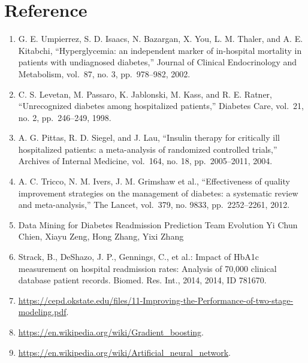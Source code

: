 \documentclass[]{article}
\begin{document}
\section{Reference}\label{reference}

\begin{enumerate}
\def\labelenumi{\arabic{enumi}.}
\itemsep1pt\parskip0pt
\item
  G. E. Umpierrez, S. D. Isaacs, N. Bazargan, X. You, L. M. Thaler, and
  A. E. Kitabchi, ``Hyperglycemia: an independent marker of in-hospital
  mortality in patients with undiagnosed diabetes,'' Journal of Clinical
  Endocrinology and Metabolism, vol.~87, no. 3, pp.~978--982, 2002.
\item
  C. S. Levetan, M. Passaro, K. Jablonski, M. Kass, and R. E. Ratner,
  ``Unrecognized diabetes among hospitalized patients,'' Diabetes Care,
  vol.~21, no. 2, pp.~246--249, 1998.
\item
  A. G. Pittas, R. D. Siegel, and J. Lau, ``Insulin therapy for
  critically ill hospitalized patients: a meta-analysis of randomized
  controlled trials,'' Archives of Internal Medicine, vol.~164, no. 18,
  pp.~2005--2011, 2004.
\item
  A. C. Tricco, N. M. Ivers, J. M. Grimshaw et al., ``Effectiveness of
  quality improvement strategies on the management of diabetes: a
  systematic review and meta-analysis,'' The Lancet, vol.~379, no. 9833,
  pp.~2252--2261, 2012.
\item
  Data Mining for Diabetes Readmission Prediction Team Evolution Yi Chun
  Chien, Xiayu Zeng, Hong Zhang, Yixi Zhang
\item
  Strack, B., DeShazo, J. P., Gennings, C., et al.: Impact of HbA1c
  measurement on hospital readmission rates: Analysis of 70,000 clinical
  database patient records. Biomed. Res. Int., 2014, 2014, ID 781670.
\item
  \url{https://cepd.okstate.edu/files/11-Improving-the-Performance-of-two-stage-modeling.pdf}.
\item
  \url{https://en.wikipedia.org/wiki/Gradient_boosting}.
\item
  \url{https://en.wikipedia.org/wiki/Artificial_neural_network}.
\end{enumerate}
\end{document}
